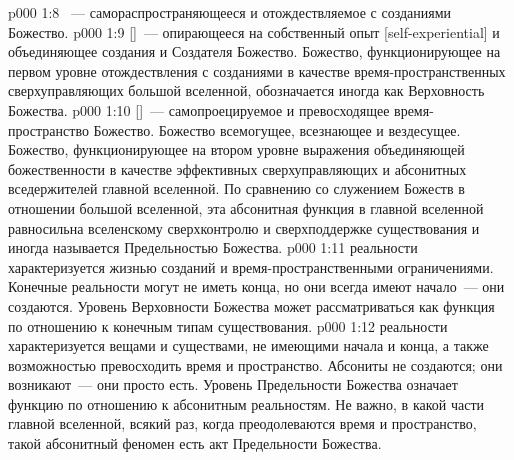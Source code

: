 \vs p000 1:8 ~--- самораспространяющееся и отождествляемое с созданиями Божество.
\vs p000 1:9  []~--- опирающееся на собственный опыт [self\hyp{}experiential] и объединяющее создания и Создателя Божество. Божество, функционирующее на первом уровне отождествления с созданиями в качестве время\hyp{}пространственных сверхуправляющих большой вселенной, обозначается иногда как Верховность Божества.
\vs p000 1:10  []~--- самопроецируемое и превосходящее время\hyp{}пространство Божество. Божество всемогущее, всезнающее и вездесущее. Божество, функционирующее на втором уровне выражения объединяющей божественности в качестве эффективных сверхуправляющих и абсонитных вседержителей главной вселенной. По сравнению со служением Божеств в отношении большой вселенной, эта абсонитная функция в главной вселенной равносильна вселенскому сверхконтролю и сверхподдержке существования и иногда называется Предельностью Божества.
\vs p000 1:11 \pc {} реальности характеризуется жизнью созданий и время\hyp{}пространственными ограничениями. Конечные реальности могут не иметь конца, но они всегда имеют начало~--- они создаются. Уровень Верховности Божества может рассматриваться как функция по отношению к конечным типам существования.
\vs p000 1:12 \pc {}  реальности характеризуется вещами и существами, не имеющими начала и конца, а также возможностью превосходить время и пространство. Абсониты не создаются; они возникают~--- они просто есть. Уровень Предельности Божества означает функцию по отношению к абсонитным реальностям. Не важно, в какой части главной вселенной, всякий раз, когда преодолеваются время и пространство, такой абсонитный феномен есть акт Предельности Божества.
